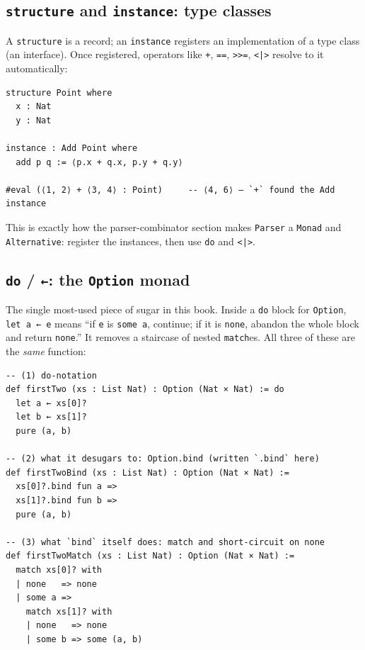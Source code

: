 \documentclass[11pt,a4paper]{article}
\theoremstyle{definition}
\begin{document}
\subsection*{\texttt{structure} and \texttt{instance}: type classes}

A \texttt{structure} is a record; an \texttt{instance} registers an
implementation of a type class (an interface). Once registered, operators like
\texttt{+}, \texttt{==}, \texttt{>>=}, \texttt{<|>} resolve to it automatically:

\begin{verbatim}
structure Point where
  x : Nat
  y : Nat

instance : Add Point where
  add p q := ⟨p.x + q.x, p.y + q.y⟩

#eval (⟨1, 2⟩ + ⟨3, 4⟩ : Point)     -- ⟨4, 6⟩ — `+` found the Add instance
\end{verbatim}

This is exactly how the parser-combinator section makes \texttt{Parser} a
\texttt{Monad} and \texttt{Alternative}: register the instances, then use
\texttt{do} and \texttt{<|>}.

\subsection*{\texttt{do} / \texttt{←}: the \texttt{Option} monad}

The single most-used piece of sugar in this book. Inside a \texttt{do} block for
\texttt{Option}, \verb|let a ← e| means ``if \texttt{e} is \texttt{some a},
continue; if it is \texttt{none}, abandon the whole block and return
\texttt{none}.'' It removes a staircase of nested \texttt{match}es. All three of
these are the \emph{same} function:

\begin{verbatim}
-- (1) do-notation
def firstTwo (xs : List Nat) : Option (Nat × Nat) := do
  let a ← xs[0]?
  let b ← xs[1]?
  pure (a, b)

-- (2) what it desugars to: Option.bind (written `.bind` here)
def firstTwoBind (xs : List Nat) : Option (Nat × Nat) :=
  xs[0]?.bind fun a =>
  xs[1]?.bind fun b =>
  pure (a, b)

-- (3) what `bind` itself does: match and short-circuit on none
def firstTwoMatch (xs : List Nat) : Option (Nat × Nat) :=
  match xs[0]? with
  | none   => none
  | some a =>
    match xs[1]? with
    | none   => none
    | some b => some (a, b)
\end{verbatim}
\end{document}
